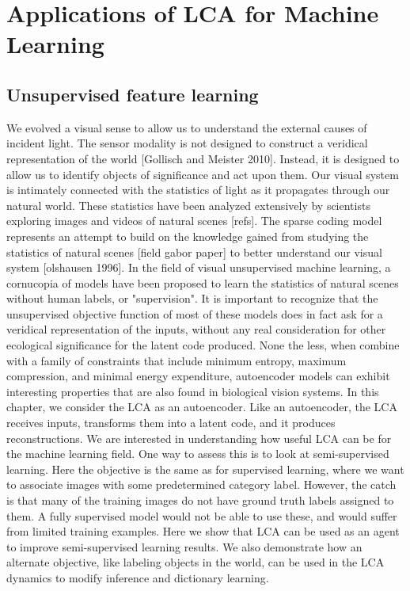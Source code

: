 \chapter{Applications of LCA for Machine Learning}

\section{Unsupervised feature learning}
We evolved a visual sense to allow us to understand the external causes of incident light. The sensor modality is not designed to construct a veridical representation of the world [Gollisch and Meister 2010]. Instead, it is designed to allow us to identify objects of significance and act upon them. Our visual system is intimately connected with the statistics of light as it propagates through our natural world. These statistics have been analyzed extensively by scientists exploring images and videos of natural scenes [refs]. The sparse coding model represents an attempt to build on the knowledge gained from studying the statistics of natural scenes [field gabor paper] to better understand our visual system [olshausen 1996]. In the field of visual unsupervised machine learning, a cornucopia of models have been proposed to learn the statistics of natural scenes without human labels, or "supervision". It is important to recognize that the unsupervised objective function of most of these models does in fact ask for a veridical representation of the inputs, without any real consideration for other ecological significance for the latent code produced. None the less, when combine with a family of constraints that include minimum entropy, maximum compression, and minimal energy expenditure, autoencoder models can exhibit interesting properties that are also found in biological vision systems. In this chapter, we consider the LCA as an autoencoder. Like an autoencoder, the LCA receives inputs, transforms them into a latent code, and it produces reconstructions. We are interested in understanding how useful LCA can be for the machine learning field. One way to assess this is to look at semi-supervised learning. Here the objective is the same as for supervised learning, where we want to associate images with some predetermined category label. However, the catch is that many of the training images do not have ground truth labels assigned to them. A fully supervised model would not be able to use these, and would suffer from limited training examples. Here we show that LCA can be used as an agent to improve semi-supervised learning results. We also demonstrate how an alternate objective, like labeling objects in the world, can be used in the LCA dynamics to modify inference and dictionary learning.

